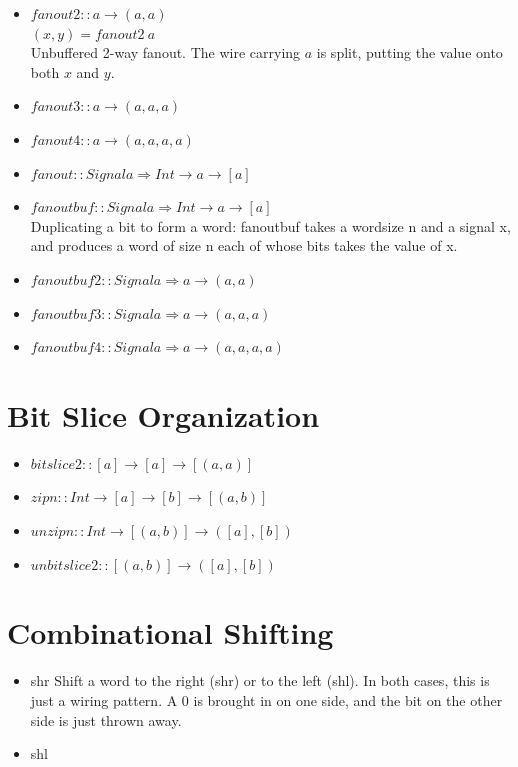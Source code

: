 \documentclass[a4paper,openany,fleqn]{book}
\begin{document}
\begin{itemize}
\item $\mathit{fanout2} :: a \rightarrow (a,a)$ \\
  $(x,y) = \mathit{fanout2}\ a$ \\
  Unbuffered 2-way fanout.  The wire carrying $a$ is split, putting
  the value onto both $x$ and $y$.
\item $\mathit{fanout3} :: a \rightarrow (a,a,a)$
\item $\mathit{fanout4} :: a \rightarrow (a,a,a,a)$
\item $\mathit{fanout} :: \mathit{Signal} a \Rightarrow Int
  \rightarrow a \rightarrow [a]$
\item $\mathit{fanoutbuf} :: \mathit{Signal} a \Rightarrow Int
  \rightarrow a \rightarrow [a]$ \\
  Duplicating a bit to form a word: fanoutbuf takes a wordsize n and a
  signal x, and produces a word of size n each of whose bits takes the
  value of x.
\item $\mathit{fanoutbuf2} :: \mathit{Signal} a \Rightarrow a
  \rightarrow (a,a)$
\item $\mathit{fanoutbuf3} :: \mathit{Signal} a \Rightarrow a
  \rightarrow (a,a,a)$
\item $\mathit{fanoutbuf4} :: Signal a \Rightarrow a \rightarrow
  (a,a,a,a)$
\end{itemize}

\section{Bit Slice Organization}
\label{sec:app-bit-slice}
\begin{itemize}
\item $bitslice2 :: [a] \rightarrow [a] \rightarrow [(a,a)]$
\item $zipn :: Int \rightarrow [a] \rightarrow [b] \rightarrow [(a,b)]$
\item $unzipn :: Int \rightarrow [(a,b)] \rightarrow ([a],[b])$
\item $unbitslice2 :: [(a,b)] \rightarrow ([a],[b])$
\end{itemize}


\section{Combinational Shifting}
\label{sec:app-comb-shift}


\begin{itemize}
\item shr Shift a word to the right (shr) or to the left (shl).  In both
cases, this is just a wiring pattern.  A 0 is brought in on one
side, and the bit on the other side is just thrown away.
\item shl
\end{itemize}
\end{document}
